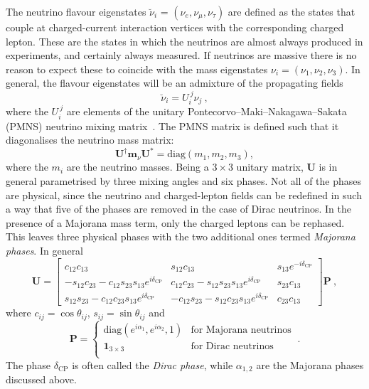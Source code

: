 The neutrino flavour eigenstates $\breve{\nu}_{i}$ =
$(\nu_{e}, \nu_{\mu}, \nu_{\tau})$ are defined as the states that couple at
charged-current interaction vertices with the corresponding charged lepton.
These are the states in which the neutrinos are almost always produced in
experiments, and certainly always measured. If neutrinos are massive there is no
reason to expect these to coincide with the mass eigenstates
$\nu_{i} = (\nu_{1}, \nu_{2}, \nu_{3})$. In general, the flavour eigenstates
will be an admixture of the propagating fields
\begin{equation}
  \label{eq:ch1-neutrino-mixing}
  \breve{\nu}_{i} = U_{i}^{\ j} \nu_{j} \ ,
\end{equation}
where the $U_{i}^{\ j}$ are elements of the unitary
Pontecorvo--Maki--Nakagawa--Sakata (PMNS) neutrino mixing
matrix~\cite{Pontecorvo:1957cp, Maki:1962mu}. The PMNS matrix is defined such
that it diagonalises the neutrino mass matrix:
\begin{equation}
  \mathbf{U}^{\dagger} \mathbf{m}_{\nu} \mathbf{U}^{*} = \mathrm{diag}(m_{1}, m_{2}, m_{3}),
\end{equation}
where the $m_i$ are the neutrino masses. Being a $3 \times 3$ unitary matrix,
$\mathbf{U}$ is in general parametrised by three mixing angles and six phases.
Not all of the phases are physical, since the neutrino and charged-lepton fields
can be redefined in such a way that five of the phases are removed in the case
of Dirac neutrinos. In the presence of a Majorana mass term, only the charged
leptons can be rephased. This leaves three physical phases with the two
additional ones termed \textit{Majorana phases}. In general
\begin{equation}
  \label{eq:ch1-pmns}
  \mathbf{U} =
  \begin{bmatrix}
    c_{12}c_{13} & s_{12} c_{13} & s_{13}e^{-i\delta_\text{CP}} \\
    -s_{12}c_{23} - c_{12}s_{23}s_{13}e^{i\delta_\text{CP}} & c_{12}c_{23} - s_{12}s_{23}s_{13}e^{i\delta_\text{CP}} & s_{23}c_{13}\\
    s_{12}s_{23} - c_{12}c_{23}s_{13}e^{i\delta_\text{CP}} & -c_{12}s_{23} - s_{12}c_{23}s_{13}e^{i\delta_\text{CP}} & c_{23}c_{13}
  \end{bmatrix}
  \mathbf{P} \ ,
\end{equation}
where $c_{ij} = \cos \theta_{ij}$, $s_{ij} = \sin \theta_{ij}$ and
\begin{equation}
  \mathbf{P} =
  \begin{cases}
    \mathrm{diag}(e^{i \alpha_{1}}, e^{i \alpha_{2}}, 1) & \text{for Majorana neutrinos} \\
    \mathbf{1}_{3 \times 3} & \text{for Dirac neutrinos} \\
  \end{cases} \ .
\end{equation}
The phase $\delta_{\text{CP}}$ is often called the \textit{Dirac phase}, while
$\alpha_{1,2}$ are the Majorana phases discussed above.

